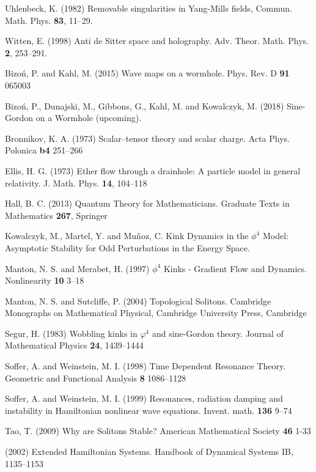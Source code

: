 \begin{thebibliography}{}
 Uhlenbeck, K. (1982) Removable singularities in Yang-Mills fields,
Commun. Math. Phys. {\bf 83}, 11--29.

 Witten, E. (1998)
Anti de Sitter space and holography. Adv. Theor. Math. Phys. {\bf 2}, 253--291.


 Bizo\'n, P. and Kahl, M. (2015)
Wave maps on a wormhole. Phys. Rev. D {\bf 91} 065003

 Bizo\'n, P., Dunajski, M., Gibbons, G., Kahl, M. and Kowalczyk, M. (2018) Sine-Gordon on a Wormhole (upcoming).

 Bronnikov, K. A. (1973)
Scalar--tensor theory and scalar charge. Acta Phys. Polonica {\bf b4} 251--266

 Ellis, H. G. (1973)
Ether flow through a drainhole: A particle model in general relativity. J. Math. Phys. {\bf 14}, 104--118

 Hall, B. C. (2013)
Quantum Theory for Mathematicians. Graduate Texts in Mathematics {\bf 267}, Springer

 Kowalczyk, M., Martel, Y. and Mu\~noz, C.
Kink Dynamics in the $\phi^4$ Model: Asymptotic Stability for Odd Perturbations in the Energy Space. 

 Manton, N. S. and Merabet, H. (1997)
$\phi^4$ Kinks - Gradient Flow and Dynamics. Nonlinearity {\bf 10} 3--18

 Manton, N. S. and Sutcliffe, P. (2004)
Topological Solitons. Cambridge Monographs on Mathematical Physical, Cambridge University Press, Cambridge

 Segur, H. (1983)
Wobbling kinks in $\varphi^4$ and sine-Gordon theory. Journal of Mathematical Physics {\bf 24}, 1439--1444

 Soffer, A. and Weinstein, M. I. (1998)
Time Dependent Resonance Theory. Geometric and Functional Analysis {\bf 8} 1086--1128

 Soffer, A. and Weinstein, M. I. (1999)
Resonances, radiation damping and instability in Hamiltonian nonlinear wave equations. Invent. math. {\bf 136} 9--74

 Tao, T. (2009)
Why are Solitons Stable? American Mathematical Society {\bf 46} 1-33

 (2002)
Extended Hamiltonian Systems. Handbook of Dynamical Systems IB, 1135--1153


\end{thebibliography}
